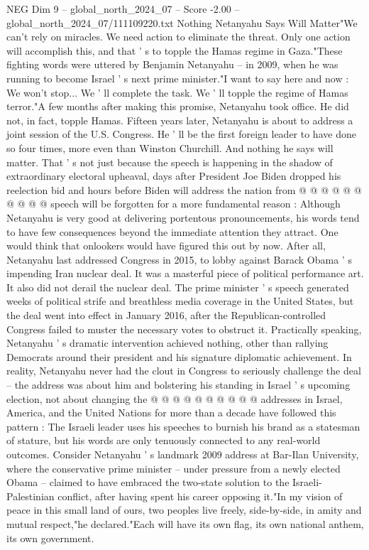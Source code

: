 \begin{textsample}{NEG Dim 9 – global\_north\_2024\_07 – Score -2.00 – global\_north\_2024\_07/111109220.txt}  \label{ex:f9_neg_144}
Nothing Netanyahu Says Will Matter"We can't rely on miracles.
We need action to eliminate the threat.
Only one action will accomplish this, and that ' s to topple the Hamas regime in Gaza."These fighting words were uttered by Benjamin Netanyahu -- in 2009, when he was running to become Israel ' s next prime minister."I want to say here and now : We won't stop...
We ' ll complete the task.
We ' ll topple the regime of Hamas terror."A few months after making this promise, Netanyahu took office.
He did not, in fact, topple Hamas.
Fifteen years later, Netanyahu is about to address a joint session of the U.S.
Congress.
He ' ll be the first foreign leader to have done so four times, more even than Winston Churchill.
And nothing he says will matter.
That ' s not just because the speech is happening in the shadow of extraordinary electoral upheaval, days after President Joe Biden dropped his reelection bid and hours before Biden will address the nation from @ @ @ @ @ @ @ @ @ @ speech will be forgotten for a more fundamental reason : Although Netanyahu is very good at delivering portentous pronouncements, his words tend to have few consequences beyond the immediate attention they attract.
One would think that onlookers would have figured this out by now.
After all, Netanyahu last addressed Congress in 2015, to lobby against Barack Obama ' s impending Iran nuclear deal.
It was a masterful piece of political performance art.
It also did not derail the nuclear deal.
The prime minister ' s speech generated weeks of political strife and breathless media coverage in the United States, but the deal went into effect in January 2016, after the Republican-controlled Congress failed to muster the necessary votes to obstruct it.
Practically speaking, Netanyahu ' s dramatic intervention achieved nothing, other than rallying Democrats around their president and his signature diplomatic achievement.
In reality, Netanyahu never had the clout in Congress to seriously challenge the deal -- the address was about him and bolstering his standing in Israel ' s upcoming election, not about changing the @ @ @ @ @ @ @ @ @ @ addresses in Israel, America, and the United Nations for more than a decade have followed this pattern : The Israeli leader uses his speeches to burnish his brand as a statesman of stature, but his words are only tenuously connected to any real-world outcomes.
Consider Netanyahu ' s landmark 2009 address at Bar-Ilan University, where the conservative prime minister -- under pressure from a newly elected Obama -- claimed to have embraced the two-state solution to the Israeli-Palestinian conflict, after having spent his career opposing it."In my vision of peace in this small land of ours, two peoples live freely, side-by-side, in amity and mutual respect,"he declared."Each will have its own flag, its own national anthem, its own government.

\end{textsample}
